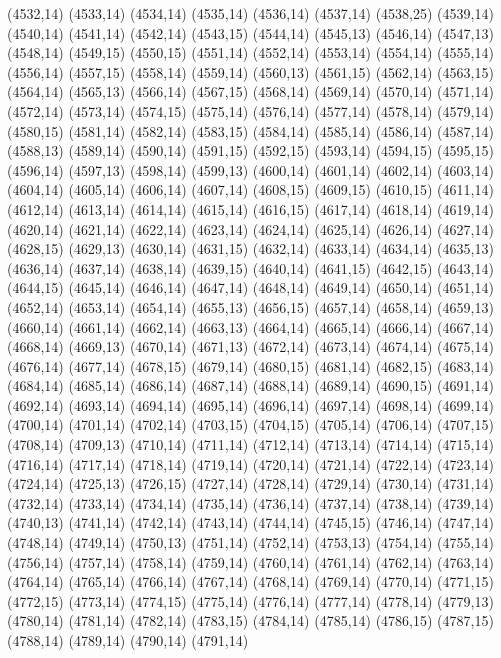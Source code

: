 (4532,14)
(4533,14)
(4534,14)
(4535,14)
(4536,14)
(4537,14)
(4538,25)
(4539,14)
(4540,14)
(4541,14)
(4542,14)
(4543,15)
(4544,14)
(4545,13)
(4546,14)
(4547,13)
(4548,14)
(4549,15)
(4550,15)
(4551,14)
(4552,14)
(4553,14)
(4554,14)
(4555,14)
(4556,14)
(4557,15)
(4558,14)
(4559,14)
(4560,13)
(4561,15)
(4562,14)
(4563,15)
(4564,14)
(4565,13)
(4566,14)
(4567,15)
(4568,14)
(4569,14)
(4570,14)
(4571,14)
(4572,14)
(4573,14)
(4574,15)
(4575,14)
(4576,14)
(4577,14)
(4578,14)
(4579,14)
(4580,15)
(4581,14)
(4582,14)
(4583,15)
(4584,14)
(4585,14)
(4586,14)
(4587,14)
(4588,13)
(4589,14)
(4590,14)
(4591,15)
(4592,15)
(4593,14)
(4594,15)
(4595,15)
(4596,14)
(4597,13)
(4598,14)
(4599,13)
(4600,14)
(4601,14)
(4602,14)
(4603,14)
(4604,14)
(4605,14)
(4606,14)
(4607,14)
(4608,15)
(4609,15)
(4610,15)
(4611,14)
(4612,14)
(4613,14)
(4614,14)
(4615,14)
(4616,15)
(4617,14)
(4618,14)
(4619,14)
(4620,14)
(4621,14)
(4622,14)
(4623,14)
(4624,14)
(4625,14)
(4626,14)
(4627,14)
(4628,15)
(4629,13)
(4630,14)
(4631,15)
(4632,14)
(4633,14)
(4634,14)
(4635,13)
(4636,14)
(4637,14)
(4638,14)
(4639,15)
(4640,14)
(4641,15)
(4642,15)
(4643,14)
(4644,15)
(4645,14)
(4646,14)
(4647,14)
(4648,14)
(4649,14)
(4650,14)
(4651,14)
(4652,14)
(4653,14)
(4654,14)
(4655,13)
(4656,15)
(4657,14)
(4658,14)
(4659,13)
(4660,14)
(4661,14)
(4662,14)
(4663,13)
(4664,14)
(4665,14)
(4666,14)
(4667,14)
(4668,14)
(4669,13)
(4670,14)
(4671,13)
(4672,14)
(4673,14)
(4674,14)
(4675,14)
(4676,14)
(4677,14)
(4678,15)
(4679,14)
(4680,15)
(4681,14)
(4682,15)
(4683,14)
(4684,14)
(4685,14)
(4686,14)
(4687,14)
(4688,14)
(4689,14)
(4690,15)
(4691,14)
(4692,14)
(4693,14)
(4694,14)
(4695,14)
(4696,14)
(4697,14)
(4698,14)
(4699,14)
(4700,14)
(4701,14)
(4702,14)
(4703,15)
(4704,15)
(4705,14)
(4706,14)
(4707,15)
(4708,14)
(4709,13)
(4710,14)
(4711,14)
(4712,14)
(4713,14)
(4714,14)
(4715,14)
(4716,14)
(4717,14)
(4718,14)
(4719,14)
(4720,14)
(4721,14)
(4722,14)
(4723,14)
(4724,14)
(4725,13)
(4726,15)
(4727,14)
(4728,14)
(4729,14)
(4730,14)
(4731,14)
(4732,14)
(4733,14)
(4734,14)
(4735,14)
(4736,14)
(4737,14)
(4738,14)
(4739,14)
(4740,13)
(4741,14)
(4742,14)
(4743,14)
(4744,14)
(4745,15)
(4746,14)
(4747,14)
(4748,14)
(4749,14)
(4750,13)
(4751,14)
(4752,14)
(4753,13)
(4754,14)
(4755,14)
(4756,14)
(4757,14)
(4758,14)
(4759,14)
(4760,14)
(4761,14)
(4762,14)
(4763,14)
(4764,14)
(4765,14)
(4766,14)
(4767,14)
(4768,14)
(4769,14)
(4770,14)
(4771,15)
(4772,15)
(4773,14)
(4774,15)
(4775,14)
(4776,14)
(4777,14)
(4778,14)
(4779,13)
(4780,14)
(4781,14)
(4782,14)
(4783,15)
(4784,14)
(4785,14)
(4786,15)
(4787,15)
(4788,14)
(4789,14)
(4790,14)
(4791,14)
